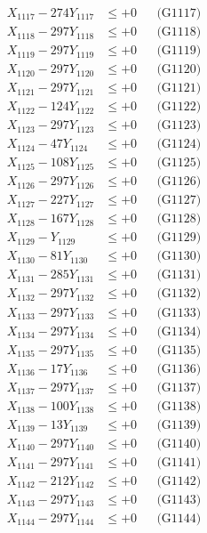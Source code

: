 \documentclass[a4paper,10pt]{article}
\begin{document}
{\begin{align}
X_{1117} - 274Y_{1117} &\leq +0 && \text{(G1117)} \\
X_{1118} - 297Y_{1118} &\leq +0 && \text{(G1118)} \\
X_{1119} - 297Y_{1119} &\leq +0 && \text{(G1119)} \\
X_{1120} - 297Y_{1120} &\leq +0 && \text{(G1120)} \\
\allowbreak
X_{1121} - 297Y_{1121} &\leq +0 && \text{(G1121)} \\
X_{1122} - 124Y_{1122} &\leq +0 && \text{(G1122)} \\
X_{1123} - 297Y_{1123} &\leq +0 && \text{(G1123)} \\
X_{1124} - 47Y_{1124} &\leq +0 && \text{(G1124)} \\
X_{1125} - 108Y_{1125} &\leq +0 && \text{(G1125)} \\
X_{1126} - 297Y_{1126} &\leq +0 && \text{(G1126)} \\
X_{1127} - 227Y_{1127} &\leq +0 && \text{(G1127)} \\
X_{1128} - 167Y_{1128} &\leq +0 && \text{(G1128)} \\
X_{1129} - Y_{1129} &\leq +0 && \text{(G1129)} \\
X_{1130} - 81Y_{1130} &\leq +0 && \text{(G1130)} \\
\allowbreak
X_{1131} - 285Y_{1131} &\leq +0 && \text{(G1131)} \\
X_{1132} - 297Y_{1132} &\leq +0 && \text{(G1132)} \\
X_{1133} - 297Y_{1133} &\leq +0 && \text{(G1133)} \\
X_{1134} - 297Y_{1134} &\leq +0 && \text{(G1134)} \\
X_{1135} - 297Y_{1135} &\leq +0 && \text{(G1135)} \\
X_{1136} - 17Y_{1136} &\leq +0 && \text{(G1136)} \\
X_{1137} - 297Y_{1137} &\leq +0 && \text{(G1137)} \\
X_{1138} - 100Y_{1138} &\leq +0 && \text{(G1138)} \\
X_{1139} - 13Y_{1139} &\leq +0 && \text{(G1139)} \\
X_{1140} - 297Y_{1140} &\leq +0 && \text{(G1140)} \\
\allowbreak
X_{1141} - 297Y_{1141} &\leq +0 && \text{(G1141)} \\
X_{1142} - 212Y_{1142} &\leq +0 && \text{(G1142)} \\
X_{1143} - 297Y_{1143} &\leq +0 && \text{(G1143)} \\
X_{1144} - 297Y_{1144} &\leq +0 && \text{(G1144)} \\

\end{align}}
\end{document}

